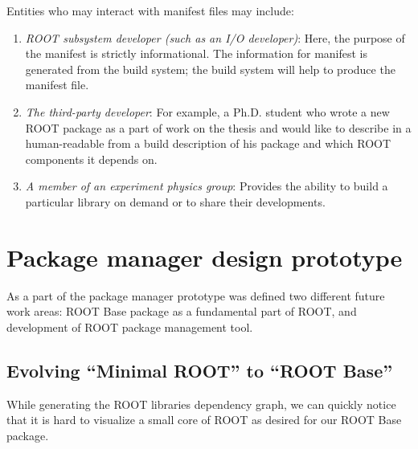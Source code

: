 \documentclass{webofc}
\begin{document}
Entities who may interact with manifest files may include:
\begin{enumerate}
\item \textit{ROOT subsystem developer (such as an I/O developer)}: Here, the purpose of the manifest is strictly informational. The information for manifest is generated from the build system; the build system will help to produce the manifest file.
\item \textit{The third-party developer}:  For example, a Ph.D. student who wrote a new ROOT package as a part of work on the thesis and would like to describe in a human-readable from a build description of his package and which ROOT components it depends on.
\item \textit{A member of an experiment physics group}: Provides the ability to build a particular library on demand or to share their developments.
\end{enumerate}



\section{Package manager design prototype}

As a part of the package manager prototype was defined two different future work areas: ROOT Base package as a fundamental part of ROOT, and development of ROOT package management tool.

\subsection{Evolving “Minimal ROOT” to “ROOT Base”}

While generating the ROOT libraries dependency graph, we can quickly notice that it is hard to visualize a small core of ROOT as desired for our ROOT Base package. %
\end{document}
